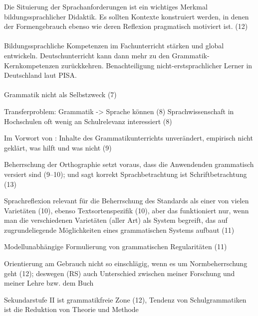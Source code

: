 Die Situierung der Sprachanforderungen ist ein wichtiges Merkmal bildungssprachlicher Didaktik. Es sollten Kontexte konstruiert werden, in denen der Formengebrauch ebenso wie deren Reflexion pragmatisch motiviert ist. (12)

\paragraph*{\citet{Schroeterbrauss2013}}

Bildungssprachliche Kompetenzen im Fachunterricht stärken und global entwickeln.
Deutschunterricht kann dann mehr zu den Grammatik-Kernkompetenzen zurückkehren.
Benachteiligung nicht-erstsprachlicher Lerner in Deutschland laut PISA.

\paragraph*{\citet{Eisenberg2013c}}

Grammatik nicht als Selbstzweck (7)



Transferproblem: Grammatik -> Sprache können (8)
Sprachwissenschaft in Hochschulen oft wenig an Schulrelevanz interessiert (8)

Im Vorwort von \citet[2]{KoepckeZiegler2013}: Inhalte des Grammatikunterrichts unverändert, empirisch nicht geklärt, was hilft und was nicht (9)

Beherrschung der Orthographie setzt voraus, dass die Anwendenden grammatisch versiert sind (9--10); und \citet{Duerscheid2013} sagt korrekt Sprachbetrachtung ist Schriftbetrachtung (13)

Sprachreflexion relevant für die Beherrschung des Standards als einer von vielen Varietäten (10), ebenso Textsortenspezifik (10), aber das funktioniert nur, wenn man die verschiedenen Varietäten (aller Art) als System begreift, das auf zugrundeliegende Möglichkeiten eines grammatischen Systems aufbaut (11)

Modellunabhängige Formulierung von grammatischen Regularitäten (11)

Orientierung am Gebrauch nicht so einschlägig, wenn es um Normbeherrschung geht (12); deswegen (RS) auch Unterschied zwischen meiner Forschung und meiner Lehre bzw. dem Buch

Sekundarstufe II ist grammatikfreie Zone (12), Tendenz von Schulgrammatiken ist die Reduktion von Theorie und Methode

